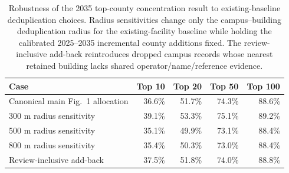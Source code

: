 \begin{table}[H]
\centering
\caption{Robustness of the 2035 top-county concentration result to existing-baseline deduplication choices. Radius sensitivities change only the campus--building deduplication radius for the existing-facility baseline while holding the calibrated 2025--2035 incremental county additions fixed. The review-inclusive add-back reintroduces dropped campus records whose nearest retained building lacks shared operator/name/reference evidence.}
\label{tab:dedup-concentration-audit}
\scriptsize
\setlength{\tabcolsep}{4pt}
\begin{tabular}{lrrrr}
\toprule
Case & Top 10 & Top 20 & Top 50 & Top 100 \\
\midrule
Canonical main Fig.~1 allocation & 36.6\% & 51.7\% & 74.3\% & 88.6\% \\
300 m radius sensitivity & 39.1\% & 53.3\% & 75.1\% & 89.2\% \\
500 m radius sensitivity & 35.1\% & 49.9\% & 73.1\% & 88.4\% \\
800 m radius sensitivity & 35.4\% & 50.3\% & 73.0\% & 88.4\% \\
Review-inclusive add-back & 37.5\% & 51.8\% & 74.0\% & 88.8\% \\
\bottomrule
\end{tabular}
\end{table}

